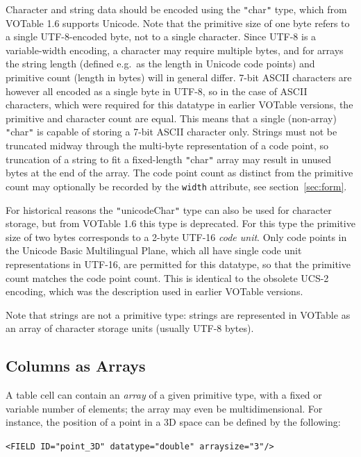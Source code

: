 \documentclass[11pt,a4paper]{ivoa}
\def\Aref#1{section~\ref{#1}}
\let\fg=\color
\def\slash {{\fg{blue}/}}
\def\attr#1{{\tt{\fg{DarkRed}#1}}}
\def\attrval#1#2{{\tt{\fg{DarkRed}#1}="{\fg{DarkPurple}#2}"}}
\def\elemdef#1#2{{\tt\fg{blue}<}{\tt{\fg{DarkRed}#1}#2}{\tt\fg{blue}>}}
\def\literalvalue#1{{\tt"}{{\fg{DarkPurple}#1}}{\tt"}}
\begin{document}
Character and string data should be encoded using the \literalvalue{char}
type, which from VOTable 1.6 supports Unicode.
Note that the primitive size of one byte refers to a single
UTF-8-encoded byte, not to a single character.
Since UTF-8 is a variable-width encoding,
a character may require multiple bytes, and for arrays the
string length (defined e.g.\ as the length in Unicode code points)
and primitive count (length in bytes)
will in general differ.
7-bit ASCII characters are however all encoded as a single byte in UTF-8,
so in the case of ASCII characters, which were required for this
datatype in earlier VOTable versions, the primitive and character count
are equal.
This means that a single (non-array) \literalvalue{char}
is capable of storing a 7-bit ASCII character only.
Strings must not be truncated midway through the multi-byte
representation of a code point,
so truncation of a string to fit a fixed-length \literalvalue{char} array
may result in unused bytes at the end of the array.
The code point count as distinct from the primitive count
may optionally be recorded by the \attr{width} attribute,
see \Aref{sec:form}.

For historical reasons the \literalvalue{unicodeChar} type can also be used
for character storage, but from VOTable 1.6 this type is deprecated.
For this type the primitive size of two bytes corresponds to a 2-byte
UTF-16 {\em code unit}.
Only code points in the Unicode Basic Multilingual Plane,
which all have single code unit representations in UTF-16,
are permitted for this datatype,
so that the primitive count matches the code point count.
This is identical to the obsolete UCS-2 encoding,
which was the description used in earlier VOTable versions.

Note that strings are not a primitive type: strings are
represented in VOTable as an array of character storage units
(usually UTF-8 bytes).


\subsection{Columns as Arrays}\label{array}
\label{sec:dim}

A table cell can contain an {\em array} of a given primitive type,
with a fixed or variable number of elements; the array may even
be multidimensional. For instance, the position of a point in a
3D space can be defined by the following:

\elemdef{FIELD}{ \attrval{ID}{point\_3D} \attrval{datatype}{double}
   \attrval{arraysize}{3}\slash}
\end{document}
